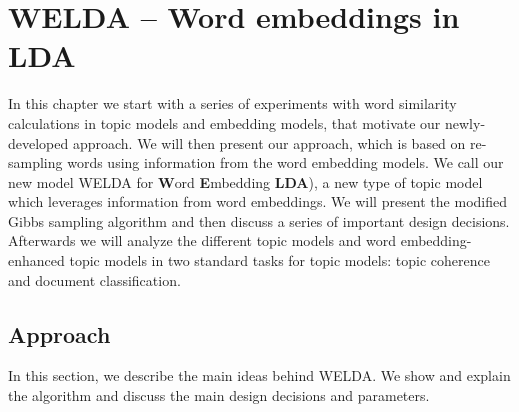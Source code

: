 \documentclass[
        a4paper,
        titlepage,
        twoside,
        parskip
        ]{scrbook}
\theoremstyle{break}
\begin{document}
%
%
%
%
%
%
%



\chapter{WELDA -- Word embeddings in LDA}

In this chapter we start with a series of experiments with word similarity calculations in topic models and embedding models, that motivate our newly-developed approach.
We will then present our approach, which is based on re-sampling words using information from the word embedding models.
We call our new model WELDA for \textbf{W}ord \textbf{E}mbedding \textbf{LDA}), a new type of topic model which leverages information from word embeddings.
We will present the modified Gibbs sampling algorithm and then discuss a series of important design decisions.
Afterwards we will analyze the different topic models and word embedding-enhanced topic models in two standard tasks for topic models: topic coherence and document classification.

\section{Approach}
In this section, we describe the main ideas behind WELDA.
We show and explain the algorithm and discuss the main design decisions and parameters.
\end{document}
